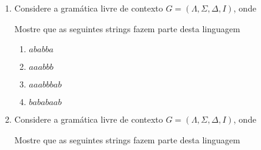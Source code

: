 \documentclass[12pt]{article}
\begin{document}
\begin{enumerate}
\item Considere a gramática livre de contexto $G = (\Lambda, \Sigma, \Delta, I)$, onde 
Mostre que as seguintes strings fazem parte desta linguagem

\begin{enumerate}

\item $ababba$

\item $aaabbb$

\item $aaabbbab$

\item $bababaab$

\end{enumerate}



\item Considere a gramática livre de contexto $G = (\Lambda, \Sigma, \Delta, I)$, onde 
Mostre que as seguintes strings fazem parte desta linguagem


\end{enumerate}
\end{document}
